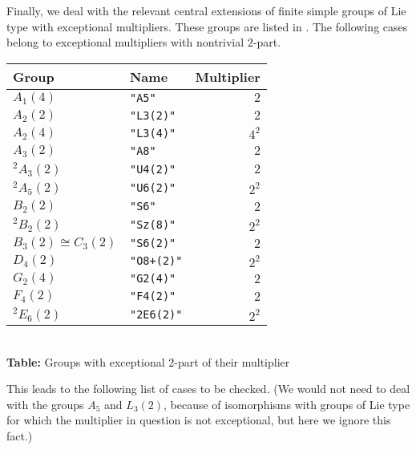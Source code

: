 \documentclass[a4paper,11pt]{report}
\begin{document}
{{{ Finally, we deal with the relevant central extensions of finite simple groups
of Lie type with exceptional multipliers. These groups are listed in \cite[p.{\nobreakspace}xvi, Table 5]{CCN85}. The following cases belong to exceptional multipliers with nontrivial $2$-part. 

 \begin{center}
\begin{tabular}{|l|l|r|}\hline
Group&
Name&
Multiplier\\
\hline
$A_1(4)$&
\texttt{"A5"}&
$2$\\
$A_2(2)$&
\texttt{"L3(2)"}&
$2$\\
$A_2(4)$&
\texttt{"L3(4)"}&
$4^2$\\
$A_3(2)$&
\texttt{"A8"}&
$2$\\
${}^2A_3(2)$&
\texttt{"U4(2)"}&
$2$\\
${}^2A_5(2)$&
\texttt{"U6(2)"}&
$2^2$\\
$B_2(2)$&
\texttt{"S6"}&
$2$\\
${}^2B_2(2)$&
\texttt{"Sz(8)"}&
$2^2$\\
$B_3(2) \cong C_3(2)$&
\texttt{"S6(2)"}&
$2$\\
$D_4(2)$&
\texttt{"O8+(2)"}&
$2^2$\\
$G_2(4)$&
\texttt{"G2(4)"}&
$2$\\
$F_4(2)$&
\texttt{"F4(2)"}&
$2$\\
${}^2E_6(2)$&
\texttt{"2E6(2)"}&
$2^2$\\
\hline
\end{tabular}\\[2mm]
\textbf{Table: }Groups with exceptional $2$-part of their multiplier\end{center}

 

 This leads to the following list of cases to be checked. (We would not need to
deal with the groups $A_5$ and $L_3(2)$, because of isomorphisms with groups of Lie type for which the multiplier in
question is not exceptional, but here we ignore this fact.) 

}}}
\end{document}
